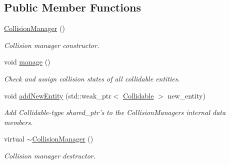 \subsection*{Public Member Functions}
\begin{DoxyCompactItemize}
\item 
\hypertarget{class_collision_manager_a81f0b3f0cc0268c80f54714cd7ddb55f}{\hyperlink{class_collision_manager_a81f0b3f0cc0268c80f54714cd7ddb55f}{Collision\+Manager} ()}\label{class_collision_manager_a81f0b3f0cc0268c80f54714cd7ddb55f}

\begin{DoxyCompactList}\small\item\em Collision manager constructor. \end{DoxyCompactList}\item 
\hypertarget{class_collision_manager_a43a05dc775565d23ecfaa1fb2638f6cf}{void \hyperlink{class_collision_manager_a43a05dc775565d23ecfaa1fb2638f6cf}{manage} ()}\label{class_collision_manager_a43a05dc775565d23ecfaa1fb2638f6cf}

\begin{DoxyCompactList}\small\item\em Check and assign collision states of all collidable entities. \end{DoxyCompactList}\item 
\hypertarget{class_collision_manager_a2ffe03a672702b8f33d8991b5d631e16}{void \hyperlink{class_collision_manager_a2ffe03a672702b8f33d8991b5d631e16}{add\+New\+Entity} (std\+::weak\+\_\+ptr$<$ \hyperlink{class_collidable}{Collidable} $>$ new\+\_\+entity)}\label{class_collision_manager_a2ffe03a672702b8f33d8991b5d631e16}

\begin{DoxyCompactList}\small\item\em Add Collidable-\/type shared\+\_\+ptr's to the Collision\+Managers internal data members. \end{DoxyCompactList}\item 
\hypertarget{class_collision_manager_acdbb3c842f0ef1c7a028d3f080855766}{virtual \hyperlink{class_collision_manager_acdbb3c842f0ef1c7a028d3f080855766}{$\sim$\+Collision\+Manager} ()}\label{class_collision_manager_acdbb3c842f0ef1c7a028d3f080855766}

\begin{DoxyCompactList}\small\item\em Collision manager destructor. \end{DoxyCompactList}\end{DoxyCompactItemize}


